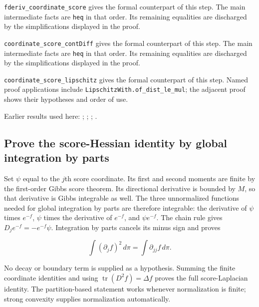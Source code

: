 \documentclass[11pt,a4paper]{report}
\begin{document}
\begin{leanbox}
\texttt{fderiv\_\allowbreak{}coordinate\_\allowbreak{}score} gives the formal counterpart of this step. The main intermediate facts are \texttt{heq} in that order. Its remaining equalities are discharged by the simplifications displayed in the proof.




\texttt{coordinate\_\allowbreak{}score\_\allowbreak{}cont\allowbreak{}Diff} gives the formal counterpart of this step. The main intermediate facts are \texttt{heq} in that order. Its remaining equalities are discharged by the simplifications displayed in the proof.




\texttt{coordinate\_\allowbreak{}score\_\allowbreak{}lipschitz} gives the formal counterpart of this step. Named proof applications include \texttt{Lipschitz\allowbreak{}With.\allowbreak{}of\_\allowbreak{}dist\_\allowbreak{}le\_\allowbreak{}mul}; the adjacent proof shows their hypotheses and order of use.
\end{leanbox}


Earlier results used here: \cite[Section~3.26.1]{LangevinLean2026ULASC}; \cite[Section~3.26.2]{LangevinLean2026ULASC}; \cite[Section~3.26.3]{LangevinLean2026ULASC}; \cite[Section~3.26.9]{LangevinLean2026ULASC}.
\subsection{\texorpdfstring{Prove the score-Hessian identity by global integration by parts}{Prove the score-Hessian identity by global integration by parts}}
\label{report-step-AverageLMC-ScoreMoment-lean-4}


Set \(\psi\) equal to the \(j\)th score coordinate. Its first and second moments are finite by the first-order Gibbs score theorem. Its directional derivative is bounded by \(M\), so that derivative is Gibbs integrable as well. The three unnormalized functions needed for global integration by parts are therefore integrable: the derivative of \(\psi\) times \(e^{-f}\), \(\psi\) times the derivative of \(e^{-f}\), and \(\psi e^{-f}\). The chain rule gives \(D_je^{-f}=-e^{-f}\psi\). Integration by parts cancels its minus sign and proves

\[\int(\partial_j f)^2\,d\pi=\int\partial_{jj}f\,d\pi.\]

No decay or boundary term is supplied as a hypothesis. Summing the finite coordinate identities and using \(\operatorname{tr}(D^2f)=\Delta f\) proves the full score-Laplacian identity. The partition-based statement works whenever normalization is finite; strong convexity supplies normalization automatically.
\end{document}
